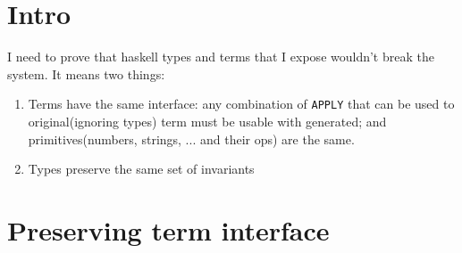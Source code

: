 \section{Intro}

I need to prove that haskell types and terms that I expose wouldn't break the system.  It means two things:
\begin{enumerate}
\item Terms have the same interface: any combination of \texttt{APPLY} that can be used to original(ignoring types)
      term must be usable with generated; and primitives(numbers, strings, ... and their ops) are the same.
\item Types preserve the same set of invariants
\end{enumerate}

\section{Preserving term interface}

